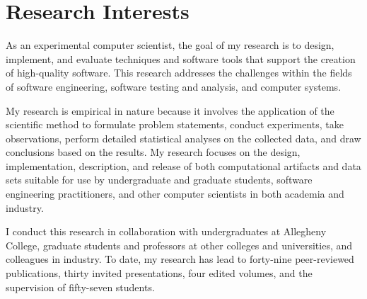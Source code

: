 \documentclass[11pt,letterpaper,sans]{moderncv}
\begin{document}
\vspace*{-.05in}
\section{Research Interests}

{\small As an experimental computer scientist, the goal of my research is to design, implement, and evaluate
  techniques and software tools that support the creation of high-quality software.  This research addresses the
challenges within the fields of software engineering, software testing and analysis, and computer systems.}
\vspace*{.05in}

{\small My research is empirical in nature because it involves the application of the scientific method to formulate
  problem statements, conduct experiments, take observations, perform detailed statistical analyses on the collected
  data, and draw conclusions based on the results.  My research focuses on the design, implementation, description, and
  release of both computational artifacts and data sets suitable for use by undergraduate and graduate students,
software engineering practitioners, and other computer scientists in both academia and industry.}
\vspace*{.05in}

{\small I conduct this research in collaboration with undergraduates at Allegheny College, graduate students and
professors at other colleges and universities, and colleagues in industry. To date, my research has lead to forty-nine
peer-reviewed publications, thirty invited presentations, four edited volumes, and the supervision of fifty-seven
students.}



\nocite{*}

\setlength\bibitemsep{-.15in}

\renewcommand*{\bibfont}{\small}

\end{document}
